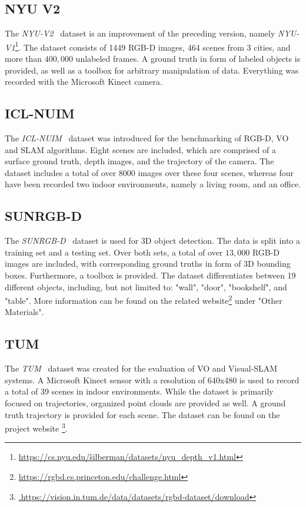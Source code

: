 \documentclass[main.tex]{subfiles}
\begin{document}
\subsection{NYU V2}
\label{subsec:bg-NYU}
The \textit{NYU-V2}~\cite{10.1007/978-3-642-33715-4_54} dataset is an improvement of the preceding version, namely \textit{NYU-V1}\footnote{\href{https://cs.nyu.edu/\~silberman/datasets/nyu\_depth\_v1.html}{https://cs.nyu.edu/\~silberman/datasets/nyu\_depth\_v1.html}}.
The dataset consists of 1449 RGB-D images, 464 scenes from 3 cities, and more than $400,000$ unlabeled frames.
A ground truth in form of labeled objects is provided, as well as a toolbox for arbitrary manipulation of data. Everything
was recorded with the Microsoft Kinect camera.

\subsection{ICL-NUIM}
\label{subsec:bg-ICL}
The \textit{ICL-NUIM}~\cite{Handa_Whelan_McDonald_Davison_2014} dataset was introduced for the benchmarking of RGB-D, VO and SLAM algorithms.
Eight scenes are included, which are comprised of a surface ground truth, depth images, and the trajectory of the camera.
The dataset includes a total of over 8000 images over these four scenes, whereas four have been recorded two
indoor environments, namely a living room, and an office.

\subsection{SUNRGB-D}
\label{subsec:bg-SUN}
The \textit{SUNRGB-D}~\cite{7298655} dataset is used for 3D object detection. The data is split into a training set and a testing set.
Over both sets, a total of over $13,000$ RGB-D images are included, with corresponding ground truths in form of 3D bounding boxes.
Furthermore, a toolbox is provided.
The dataset differentiates between 19 different objects, including, but not limited to: "wall", "door", "bookshelf", and "table".
More information can be found on the related website\footnote{\href{https://rgbd.cs.princeton.edu/challenge.html}{https://rgbd.cs.princeton.edu/challenge.html}}
under "Other Materials".

\subsection{TUM}
\label{subsec:bg-TUM}
The \textit{TUM}~\cite{sturm12iros} dataset was created for the evaluation of VO and Visual-SLAM systems.
A Microsoft Kinect sensor with a resolution of 640x480 is used to record a total of 39 scenes in indoor environments.
While the dataset is primarily focused on trajectories, organized point clouds are provided as well. A ground
truth trajectory is provided for each scene.
The dataset can be found on the project website \footnote{\href{https://vision.in.tum.de/data/datasets/rgbd-dataset/download}{.https://vision.in.tum.de/data/datasets/rgbd-dataset/download}}.
\end{document}
